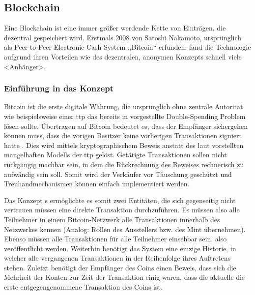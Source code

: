 \subsection{Blockchain}
\label{sec:sota_blockchain}
    Eine Blockchain ist eine immer größer werdende Kette von Einträgen, die dezentral gespeichert wird. 
    Erstmals 2008 von Satoshi Nakamoto, ursprünglich als Peer-to-Peer Electronic Cash System ,,Bitcoin`` erfunden, fand die Technologie aufgrund ihren Vorteilen wie des dezentralen, anonymen Konzepts schnell viele <Anhänger>. 
    
    \subsubsection{Einführung in das Konzept}
    \label{sec:sota_blockchain_introduction}
    Bitcoin ist die erste digitale Währung, die ursprünglich ohne zentrale Autorität wie beispielsweise einer \gls{ttp} das bereits in  vorgestellte Double-Spending Problem lösen sollte\cite{Nakamoto2008}. 
    Übertragen auf Bitcoin bedeutet es, dass der Empfänger sichergehen können muss, dass die vorigen Besitzer keine vorherigen Transaktionen signiert hatte \cite{Nakamoto2008}.
    Dies wird mittels kryptographischem Beweis anstatt des laut \citeauthor{Nakamoto2008} vorstellten mangelhaften Modells der \gls{ttp} gelöst.
    Getätigte Transaktionen sollen nicht rückgängig machbar sein, in dem die Rückrechnung des Beweises rechnerisch zu aufwändig sein soll\cite{Nakamoto2008}.
    Somit wird der Verkäufer vor Täuschung geschützt und Treuhandmechanismen können einfach implementiert werden\cite{Nakamoto2008}.  
    
    Das Konzept \citeauthor{Nakamoto2008}s ermöglichte es somit zwei Entitäten, die sich gegenseitig nicht vertrauen müssen eine direkte Transaktion durchzuführen.
    Es müssen also alle Teilnehmer in einem Bitcoin-Netzwerk alle Transaktionen innerhalb des Netzwerkes kennen (Analog: Rollen des Ausstellers bzw. des Mint übernehmen).
    Ebenso müssen alle Transaktionen für alle Teilnehmer einsehbar sein, also veröffentlicht werden.
    Weiterhin benötigt das System eine einzige Historie, in welcher alle vergangenen Transaktionen in der Reihenfolge ihres Auftretens stehen.
    Zuletzt benötigt der Empfänger des Coins einen Beweis, dass sich die Mehrheit der Konten zur Zeit der Transaktion einig waren, dass die aktuelle die erste entgegengenommene Transaktion des Coins ist. 
    \cite{Nakamoto2008}
    \medskip\\
    

